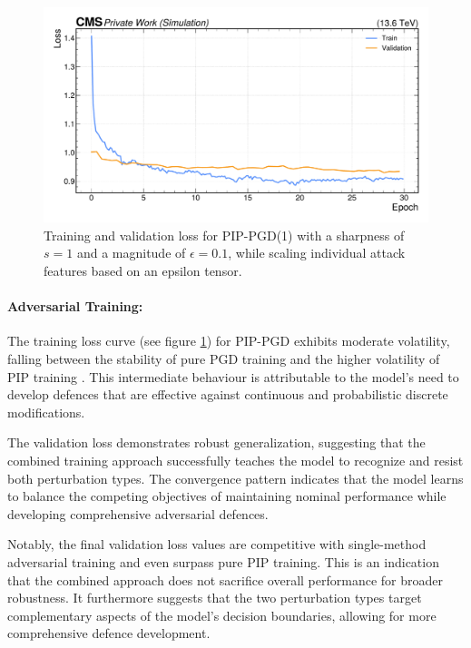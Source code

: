 \begin{figure}[H]
\centering
    \includegraphics[width=15cm]{media/output/combined_loss_validation.pdf}
    \caption{Training and validation loss for PIP-PGD(1) with a sharpness of $s=1$ and a magnitude of $\epsilon=0.1$, while scaling individual attack features based on an epsilon tensor.}
    \label{fig:combined_training_loss}
\end{figure}


\FloatBarrier
\paragraph{Adversarial Training:} The training loss curve (see figure \ref{fig:combined_training_loss}) for PIP-PGD exhibits moderate volatility, falling between the stability of pure PGD training and the higher volatility of PIP training . This intermediate behaviour is attributable to the model's need to develop defences that are effective against continuous and probabilistic discrete modifications.



The validation loss demonstrates robust generalization, suggesting that the combined training approach successfully teaches the model to recognize and resist both perturbation types. The convergence pattern indicates that the model learns to balance the competing objectives of maintaining nominal performance while developing comprehensive adversarial defences.

Notably, the final validation loss values are competitive with single-method adversarial training and even surpass pure PIP training. This is an indication that the combined approach does not sacrifice overall performance for broader robustness. It furthermore suggests that the two perturbation types target complementary aspects of the model's decision boundaries, allowing for more comprehensive defence development.

